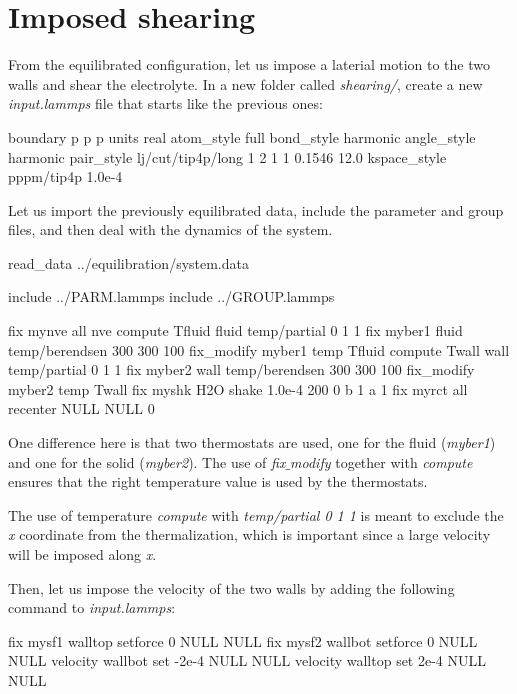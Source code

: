 \section{Imposed shearing}
\noindent From the equilibrated configuration, let us impose a laterial
motion to the two walls and shear the electrolyte.
In a new folder called \textit{shearing/},
create a new \textit{input.lammps} file that starts like the previous ones:

\begin{lcverbatim}
boundary p p p
units real
atom_style full
bond_style harmonic
angle_style harmonic
pair_style lj/cut/tip4p/long 1 2 1 1 0.1546 12.0
kspace_style pppm/tip4p 1.0e-4
\end{lcverbatim}

\noindent Let us import the previously equilibrated data,
include the parameter and group files,
and then deal with the dynamics of the system.

\begin{lcverbatim}
read_data ../equilibration/system.data

include ../PARM.lammps
include ../GROUP.lammps

fix mynve all nve
compute Tfluid fluid temp/partial 0 1 1
fix myber1 fluid temp/berendsen 300 300 100
fix_modify myber1 temp Tfluid
compute Twall wall temp/partial 0 1 1
fix myber2 wall temp/berendsen 300 300 100
fix_modify myber2 temp Twall
fix myshk H2O shake 1.0e-4 200 0 b 1 a 1
fix myrct all recenter NULL NULL 0
\end{lcverbatim}

\noindent One difference here is that two thermostats are used,
one for the fluid (\textit{myber1}) and one
for the solid (\textit{myber2}). The use of \textit{fix$\_$modify} together
with \textit{compute} ensures that the right temperature value
is used by the thermostats.

\vspace{0.25cm} \noindent The use of temperature \textit{compute} with \textit{temp/partial 0 1 1}
is meant to exclude the \textit{x} coordinate from the
thermalization, which is important since a large velocity
will be imposed along \textit{x}. 

\vspace{0.25cm} \noindent Then, let us impose the velocity of the two walls 
by adding the following command to \textit{input.lammps}:

\begin{lcverbatim}
fix mysf1 walltop setforce 0 NULL NULL
fix mysf2 wallbot setforce 0 NULL NULL
velocity wallbot set -2e-4 NULL NULL
velocity walltop set 2e-4 NULL NULL
\end{lcverbatim}

